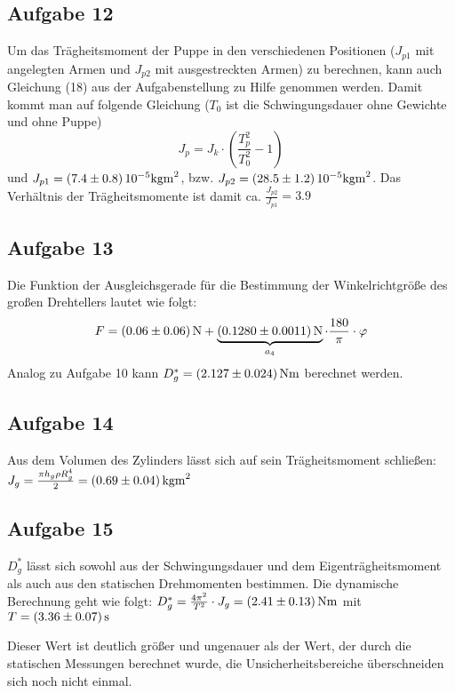 \documentclass[a4paper, 11pt, ngerman]{scrartcl}
\begin{document}
\subsection{Aufgabe 12}\label{sub:A12}
Um das Trägheitsmoment der Puppe in den verschiedenen Positionen ($J_{p1}$ mit angelegten Armen und $J_{p2}$ mit ausgestreckten Armen) zu berechnen, kann auch Gleichung (18) aus der Aufgabenstellung zu Hilfe genommen werden. Damit kommt man auf folgende Gleichung ($T_0$ ist die Schwingungsdauer ohne Gewichte und ohne Puppe)
\begin{equation}\label{equ:TraegheitsmomentPuppe}
J_p = J_k \cdot \left(\frac{T_p^2}{T_0^2} - 1\right)
\end{equation}
und $J_{p1} = \SI{7.4 \pm 0.8}{10^{-5}kgm^2}$, bzw. $J_{p2} = \SI{28.5 \pm 1.2}{10^{-5}kgm^2}$. Das Verhältnis der Trägheitsmomente ist damit ca. $\frac{J_{p2}}{J_{p1}} = 3.9$

\subsection{Aufgabe 13}

Die Funktion der Ausgleichsgerade für die Bestimmung der Winkelrichtgröße des großen Drehtellers lautet wie folgt:
\begin{equation}
F = \SI{0.06 \pm 0.06}{N} + \underbrace{\SI{0.1280 \pm 0.0011}{N}}_{a_4} \cdot \frac{180}{\pi} \cdot \varphi
\end{equation}
Analog zu Aufgabe 10 kann $D^*_g = \SI{2.127 \pm 0.024}{Nm}$ berechnet werden.

\subsection{Aufgabe 14}
Aus dem Volumen des Zylinders lässt sich auf sein Trägheitsmoment schließen: $J_g = \frac{\pi h_g \rho R_g^4}{2} = \SI{0.69 \pm 0.04}{kgm^2}$

\subsection{Aufgabe 15}
$D^*_g$ lässt sich sowohl aus der Schwingungsdauer und dem Eigenträgheitsmoment als auch aus den statischen Drehmomenten bestimmen. Die dynamische Berechnung geht wie folgt: $D^*_g = \frac{4\pi^2}{T^2} \cdot J_g = \SI{2.41 \pm 0.13}{Nm}$ mit $T = \SI{3.36 \pm 0.07}{s}$

Dieser Wert ist deutlich größer und ungenauer als der Wert, der durch die statischen Messungen berechnet wurde, die Unsicherheitsbereiche überschneiden sich noch nicht einmal.
\end{document}
